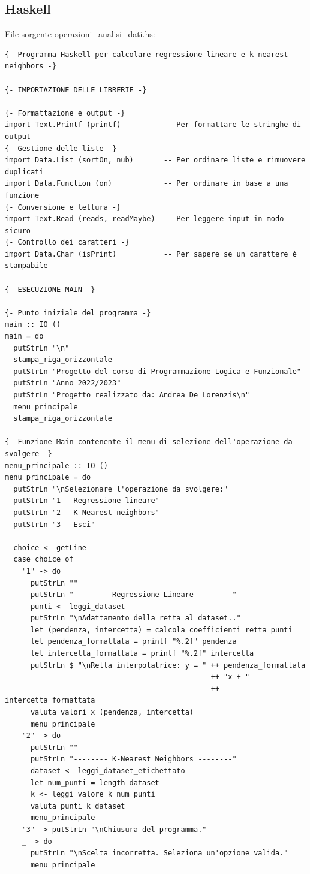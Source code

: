 \documentclass[11pt]{article}
\theoremstyle{definition}
\begin{document}
\subsection{Haskell}
\underline{File sorgente operazioni\_analisi\_dati.hs:}
\vspace{0.4cm}
\small
\begin{verbatim}
{- Programma Haskell per calcolare regressione lineare e k-nearest neighbors -}

{- IMPORTAZIONE DELLE LIBRERIE -}

{- Formattazione e output -}
import Text.Printf (printf)          -- Per formattare le stringhe di output
{- Gestione delle liste -}
import Data.List (sortOn, nub)       -- Per ordinare liste e rimuovere duplicati
import Data.Function (on)            -- Per ordinare in base a una funzione
{- Conversione e lettura -}
import Text.Read (reads, readMaybe)  -- Per leggere input in modo sicuro
{- Controllo dei caratteri -}
import Data.Char (isPrint)           -- Per sapere se un carattere è stampabile

{- ESECUZIONE MAIN -}

{- Punto iniziale del programma -}
main :: IO ()
main = do
  putStrLn "\n"
  stampa_riga_orizzontale
  putStrLn "Progetto del corso di Programmazione Logica e Funzionale"
  putStrLn "Anno 2022/2023"
  putStrLn "Progetto realizzato da: Andrea De Lorenzis\n"
  menu_principale
  stampa_riga_orizzontale

{- Funzione Main contenente il menu di selezione dell'operazione da svolgere -}
menu_principale :: IO ()
menu_principale = do
  putStrLn "\nSelezionare l'operazione da svolgere:"
  putStrLn "1 - Regressione lineare"
  putStrLn "2 - K-Nearest neighbors"
  putStrLn "3 - Esci"

  choice <- getLine
  case choice of
    "1" -> do
      putStrLn ""
      putStrLn "-------- Regressione Lineare --------"
      punti <- leggi_dataset
      putStrLn "\nAdattamento della retta al dataset.."
      let (pendenza, intercetta) = calcola_coefficienti_retta punti
      let pendenza_formattata = printf "%.2f" pendenza
      let intercetta_formattata = printf "%.2f" intercetta
      putStrLn $ "\nRetta interpolatrice: y = " ++ pendenza_formattata 
                                                ++ "x + " 
                                                ++ intercetta_formattata
      valuta_valori_x (pendenza, intercetta)
      menu_principale
    "2" -> do
      putStrLn ""
      putStrLn "-------- K-Nearest Neighbors --------"
      dataset <- leggi_dataset_etichettato
      let num_punti = length dataset
      k <- leggi_valore_k num_punti
      valuta_punti k dataset
      menu_principale
    "3" -> putStrLn "\nChiusura del programma."
    _ -> do
      putStrLn "\nScelta incorretta. Seleziona un'opzione valida."
      menu_principale


\end{verbatim}
\end{document}

